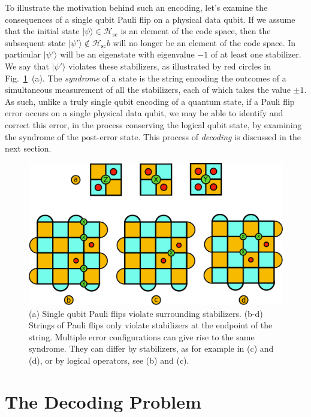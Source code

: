 \documentclass[twocolumn,preprintnumbers,amsmath,amssymb,notitlepage,nofootinbib,longbibliography,superscriptaddress,aps,pra,10pt]{revtex4-1}
\begin{document}
	To illustrate the motivation behind such an encoding, let's examine the consequences of a single qubit Pauli flip on a physical data qubit.
	If we assume that the initial state $|\psi\rangle \in \mathcal{H}_\mathrm{sc}$ is an element of the code space, then the subsequent state $|\psi'\rangle \not \in \mathcal{H}_\mathrm{sc}b$ will no longer be an element of the code space.
	In particular $|\psi'\rangle$ will be an eigenstate with eigenvalue $-1$ of at least one stabilizer.
	We say that $|\psi'\rangle$ violates these stabilizers, as illustrated by red circles in Fig.~\ref{f:surface_code_examples}~(a).
	The \textit{syndrome} of a state is the string encoding the outcomes of a simultaneous measurement of all the stabilizers, each of which takes the value $\pm 1$.
	As such, unlike a truly single qubit encoding of a quantum state, if a Pauli flip error occurs on a single physical data qubit, we may be able to identify and correct this error, in the process conserving the logical qubit state, by examining the syndrome of the post-error state. 
	This process of \textit{decoding} is discussed in the next section.

	\begin{figure}
		\centering
		\includegraphics[width=1\linewidth]{figures/surface_code_examples.pdf}
		\caption{
			(a) Single qubit Pauli flips violate surrounding stabilizers.
			(b-d) Strings of Pauli flips only violate stabilizers at the endpoint of the string.
			Multiple error configurations can give rise to the same syndrome.
			They can differ by stabilizers, as for example in (c) and (d), or by logical operators, see (b) and (c).
		}
		\label{f:surface_code_examples}
	\end{figure}


\section{The Decoding Problem}\label{s:the_decoding_problem}
\end{document}
